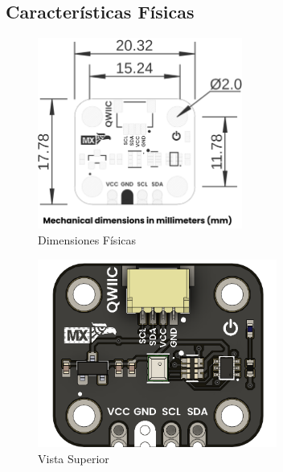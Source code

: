 \documentclass[11pt,a4paper]{article}
\begin{document}
\subsection{Características Físicas}


\begin{figure}[H]
\centering
\includegraphics[width=0.6\textwidth]{es_unit_dimension_v_1_0_0_icp10111_barometric_pressure_sensor.png}
\caption{Dimensiones Físicas}
\label{fig:es-unit-dimension-v-1-0-0-icp10111-barometric-pressure-sensor-png}
\end{figure}




\begin{figure}[H]
\centering
\includegraphics[width=0.7\textwidth]{es_unit_top_v_1_0_0_icp10111_barometric_pressure_sensor.png}
\caption{Vista Superior}
\label{fig:es-unit-top-v-1-0-0-icp10111-barometric-pressure-sensor-png}
\end{figure}
\end{document}
